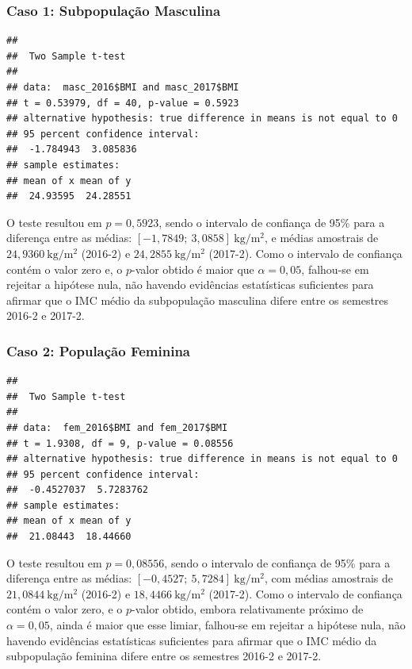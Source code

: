 \documentclass[
]{article}
\begin{document}
\subsubsection{Caso 1: Subpopulação Masculina}\label{caso-1-subpopulauxe7uxe3o-masculina}

\begin{verbatim}
## 
##  Two Sample t-test
## 
## data:  masc_2016$BMI and masc_2017$BMI
## t = 0.53979, df = 40, p-value = 0.5923
## alternative hypothesis: true difference in means is not equal to 0
## 95 percent confidence interval:
##  -1.784943  3.085836
## sample estimates:
## mean of x mean of y 
##  24.93595  24.28551
\end{verbatim}

O teste resultou em \(p = 0{,}5923\), sendo o intervalo de confiança de 95\% para a diferença entre as médias: \([-1{,}7849;\ 3{,}0858]\ \mathrm{kg/m^2}\), e médias amostrais de \(24{,}9360\ \mathrm{kg/m^2}\) (2016-2) e \(24{,}2855\ \mathrm{kg/m^2}\) (2017-2). Como o intervalo de confiança contém o valor zero e, o \(p\)-valor obtido é maior que \(\alpha = 0{,}05\), falhou-se em rejeitar a hipótese nula, não havendo evidências estatísticas suficientes para afirmar que o IMC médio da subpopulação masculina difere entre os semestres 2016-2 e 2017-2.

\subsubsection{Caso 2: População Feminina}\label{caso-2-populauxe7uxe3o-feminina}

\begin{verbatim}
## 
##  Two Sample t-test
## 
## data:  fem_2016$BMI and fem_2017$BMI
## t = 1.9308, df = 9, p-value = 0.08556
## alternative hypothesis: true difference in means is not equal to 0
## 95 percent confidence interval:
##  -0.4527037  5.7283762
## sample estimates:
## mean of x mean of y 
##  21.08443  18.44660
\end{verbatim}

O teste resultou em \(p = 0{,}08556\), sendo o intervalo de confiança de 95\% para a diferença entre as médias: \([-0{,}4527;\ 5{,}7284]\ \mathrm{kg/m^2}\), com médias amostrais de \(21{,}0844\ \mathrm{kg/m^2}\) (2016-2) e \(18{,}4466\ \mathrm{kg/m^2}\) (2017-2). Como o intervalo de confiança contém o valor zero, e o \(p\)-valor obtido, embora relativamente próximo de \(\alpha = 0{,}05\), ainda é maior que esse limiar, falhou-se em rejeitar a hipótese nula, não havendo evidências estatísticas suficientes para afirmar que o IMC médio da subpopulação feminina difere entre os semestres 2016-2 e 2017-2.
\end{document}
